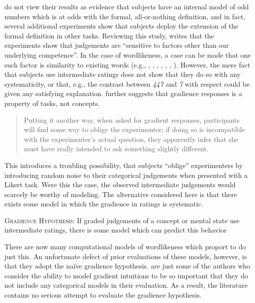 \citeauthor{Armstrong1983} do not view their results as evidence that subjects have an internal model of odd numbers which is at odds with the formal, all-or-nothing definition, and in fact, several additional experiments show that subjects deploy the extension of the formal definition in other tasks. Reviewing this study, \citet[215]{Schutze2011} writes that the experiments show that judgements are ``sensitive to factors other than our underlying competence''. In the case of wordlikeness, a case can be made that one such factor is similarity to existing words (e.g., \citealt[][151, fn. 27]{LSLT}, \citealt{Greenberg1964}, \citealt{Vitz1973}, \citealt{Ohala1986b}, \citealt{Sendlmeier1987}, \citealt{Bailey2001}, \citealt{Schutze2005}). However, the mere fact that subjects use intermediate ratings does not show that they do so with any systematicity, or that, e.g., the contrast between \emph{447} and \emph{7} with respect could be given any satisfying explanation. \citeauthor{Schutze2011} further suggests that gradience responses is a property of tasks, not concepts.

\begin{quote}
Putting it another way, when asked for gradient responses, participants will find some way to oblige the experimenter; if doing so is incompatible with the experimenter's actual question, they apparently infer that she must have really intended to ask something slightly different. \citep[][215]{Schutze2011}
\end{quote}

This introduces a troubling possibility, that subjects ``oblige'' experimenters by introducing random noise to their categorical judgements when presented with a Likert task. Were this the case, the observed intermediate judgements would scarcely be worthy of modeling. The alternative considered here is that there exists some model in which the gradience in ratings is systematic. 

\begin{unlabeledexample}
\textsc{Gradience Hypothesis}: If graded judgements of a concept or mental state use intermediate ratings, there is some model which can predict this behavior
\end{unlabeledexample}

\noindent There are now many computational models of wordlikeness which proport to do just this. An unfortunate defect of prior evaluations of these models, however, is that they adopt the naïve gradience hypothesis. \citet[382]{Hayes2008a} are just some of the authors who consider the ability to model gradient intuitions to be so important that they do not include any categorical models in their evaluation. As a result, the literature contains no serious attempt to evaluate the gradience hypothesis.

